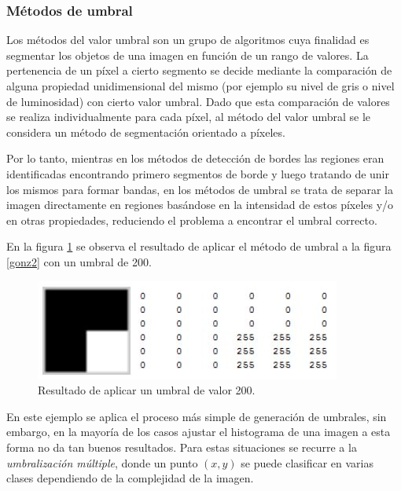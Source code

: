 \subsubsection{Métodos de umbral} %
\label{umbralSec}

Los métodos del valor umbral son un grupo de algoritmos cuya finalidad es segmentar los objetos de una imagen en función de un rango de valores. La pertenencia de un píxel a cierto segmento se decide mediante la comparación de alguna propiedad unidimensional del mismo (por ejemplo su nivel de gris o nivel de luminosidad) con cierto valor umbral. Dado que esta comparación de valores se realiza individualmente para cada píxel, al método del valor umbral se le considera un método de segmentación orientado a píxeles.

Por lo tanto, mientras en los métodos de detección de bordes las regiones eran identificadas encontrando primero segmentos de borde y luego tratando de unir los mismos para formar bandas, en los métodos de umbral se trata de separar la imagen directamente en regiones basándose en la intensidad de estos píxeles y/o en otras propiedades, reduciendo el problema a encontrar el umbral correcto.

En la figura \ref{gonz3} se observa el resultado de aplicar el método de umbral a la figura \ref{gonz2} con un umbral de 200.

\begin{figure}[H]
\begin{center}
\includegraphics[scale=0.8]{img/03_escala_grises_umbral.jpg}
\end{center}
\caption{Resultado de aplicar un umbral de valor 200.}
\label{gonz3}
\end{figure}


En este ejemplo se aplica el proceso más simple de generación de umbrales, sin embargo, en la mayoría de los casos ajustar el histograma de una imagen a esta forma no da tan buenos resultados. Para estas situaciones se recurre a la \textit{umbralización múltiple}, donde un punto $(x,y)$ se puede clasificar en varias clases dependiendo de la complejidad de la imagen.

